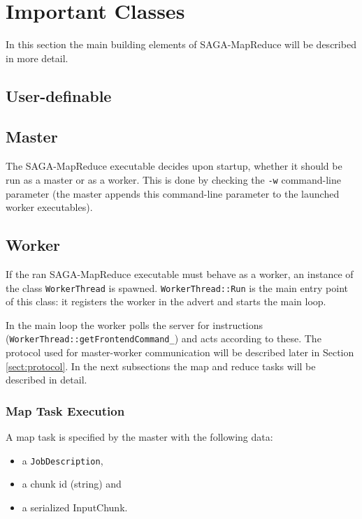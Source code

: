 \documentclass{article}
\begin{document}
\section{Important Classes}

In this section the main building elements of SAGA-MapReduce will be described in more detail.

\subsection{User-definable}


\subsection{Master}

The SAGA-MapReduce executable decides upon startup, whether it should be run as a master or as a worker. This is done by checking the \texttt{-w} command-line parameter (the master appends this command-line parameter to the launched worker executables).



\subsection{Worker}

If the ran SAGA-MapReduce executable must behave as a worker, an instance of the class \texttt{WorkerThread} is spawned.
\texttt{WorkerThread::Run} is the main entry point of this class: it registers the worker in the advert and starts the main loop.

In the main loop the worker polls the server for instructions (\texttt{WorkerThread::getFrontendCommand\_}) and acts according to these. The protocol used for master-worker communication will be described later in Section \ref{sect:protocol}. In the next subsections the map and reduce tasks will be described in detail.

\subsubsection{Map Task Execution}
\label{sect:worker_map_task}

A map task is specified by the master with the following data:
\begin{itemize}
  \item a \texttt{JobDescription},
  \item a chunk id (string) and
  \item a serialized InputChunk.
\end{itemize}
\end{document}
